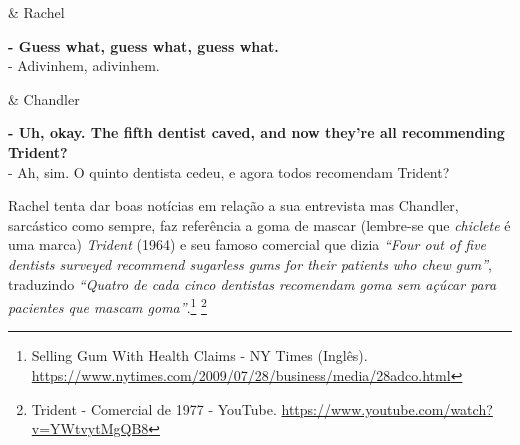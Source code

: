 \begin{tcolorbox}[enhanced,center upper,
    drop fuzzy shadow southeast, boxrule=0.3pt,
    lower separated=false, breakable,
    colframe=black!30!dialogoBorder,colback=white]
\begin{minipage}[c]{0.16\linewidth}
   & \centering \scriptsize{Rachel}
\end{minipage}
\hfill
\begin{minipage}[c]{0.8\linewidth}
  \textbf{- Guess what, guess what, guess what.}\\
  - Adivinhem, adivinhem.
\end{minipage}

\medskip
\begin{minipage}[c]{0.16\linewidth}
   & \centering \scriptsize{Chandler}
\end{minipage}
\hfill
\begin{minipage}[c]{0.8\linewidth}
  \textbf{- Uh, okay. The fifth dentist caved, and now they're all recommending Trident?}\\
  - Ah, sim. O quinto dentista cedeu, e agora todos recomendam Trident?
\end{minipage}
\end{tcolorbox}

Rachel tenta dar boas notícias em relação a sua entrevista mas Chandler,
sarcástico como sempre, faz referência a goma de mascar (lembre-se que
\emph{chiclete} é uma marca) \emph{Trident} (1964) e seu famoso
comercial que dizia \emph{``Four out of five dentists surveyed recommend
sugarless gums for their patients who chew gum''}, traduzindo
\emph{``Quatro de cada cinco dentistas recomendam goma sem açúcar para
pacientes que mascam goma''}.\footnote{\sloppy Selling Gum With Health Claims - NY Times (Inglês). \url{https://www.nytimes.com/2009/07/28/business/media/28adco.html}}
\footnote{\sloppy Trident - Comercial de 1977 - YouTube. \url{https://www.youtube.com/watch?v=YWtvytMgQB8}}

